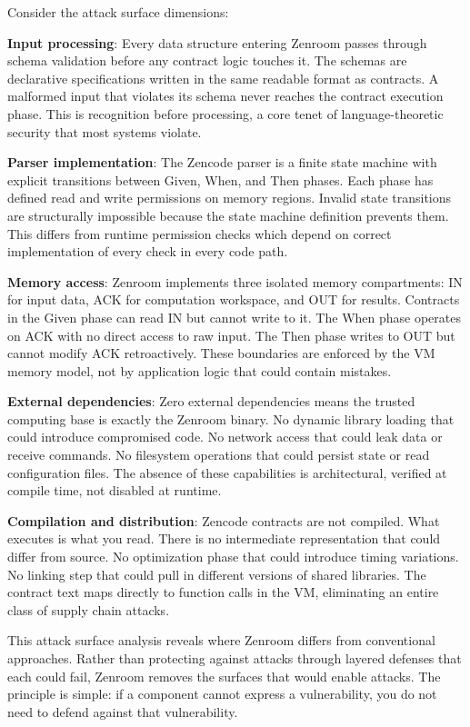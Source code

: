Consider the attack surface dimensions:

\textbf{Input processing}: Every data structure entering Zenroom
passes through schema validation before any contract logic touches
it. The schemas are declarative specifications written in the same
readable format as contracts. A malformed input that violates its
schema never reaches the contract execution phase. This is recognition
before processing, a core tenet of language-theoretic security that
most systems violate.

\textbf{Parser implementation}: The Zencode parser is a finite state
machine with explicit transitions between Given, When, and Then
phases. Each phase has defined read and write permissions on memory
regions. Invalid state transitions are structurally impossible because
the state machine definition prevents them. This differs from runtime
permission checks which depend on correct implementation of every
check in every code path.

\textbf{Memory access}: Zenroom implements three isolated memory
compartments: IN for input data, ACK for computation workspace, and
OUT for results. Contracts in the Given phase can read IN but cannot
write to it. The When phase operates on ACK with no direct access to
raw input. The Then phase writes to OUT but cannot modify ACK
retroactively. These boundaries are enforced by the VM memory model,
not by application logic that could contain mistakes.

\textbf{External dependencies}: Zero external dependencies means the
trusted computing base is exactly the Zenroom binary. No dynamic
library loading that could introduce compromised code. No network
access that could leak data or receive commands. No filesystem
operations that could persist state or read configuration files. The
absence of these capabilities is architectural, verified at compile
time, not disabled at runtime.

\textbf{Compilation and distribution}: Zencode contracts are not
compiled. What executes is what you read. There is no intermediate
representation that could differ from source. No optimization phase
that could introduce timing variations. No linking step that could
pull in different versions of shared libraries. The contract text maps
directly to function calls in the VM, eliminating an entire class of
supply chain attacks.

This attack surface analysis reveals where Zenroom differs from
conventional approaches. Rather than protecting against attacks
through layered defenses that each could fail, Zenroom removes the
surfaces that would enable attacks. The principle is simple: if a
component cannot express a vulnerability, you do not need to defend
against that vulnerability.

